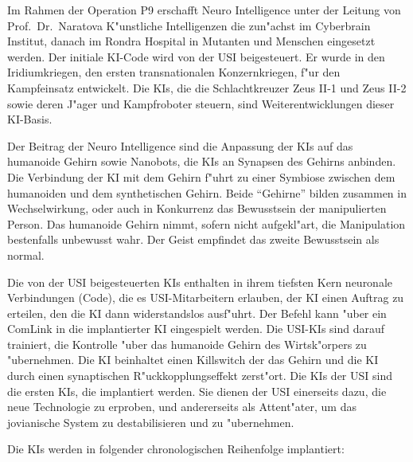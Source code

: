 
Im Rahmen der Operation P9 erschafft Neuro Intelligence unter der Leitung von Prof.~Dr.~Naratova K"unstliche Intelligenzen die zun"achst im Cyberbrain Institut, danach im Rondra Hospital in Mutanten und Menschen eingesetzt werden. Der initiale KI-Code wird von der USI beigesteuert. Er wurde in den Iridiumkriegen, den ersten transnationalen Konzernkriegen, f"ur den Kampfeinsatz entwickelt. Die KIs, die die Schlachtkreuzer Zeus II-1 und Zeus II-2 sowie deren J"ager und Kampfroboter steuern, sind Weiterentwicklungen dieser KI-Basis. 

Der Beitrag der Neuro Intelligence sind die Anpassung der KIs auf das humanoide Gehirn sowie Nanobots, die KIs an Synapsen des Gehirns anbinden. Die Verbindung der KI mit dem Gehirn f"uhrt zu einer Symbiose zwischen dem humanoiden und dem synthetischen Gehirn. Beide ``Gehirne'' bilden zusammen in Wechselwirkung, oder auch in Konkurrenz das Bewusstsein der manipulierten Person. Das humanoide Gehirn nimmt, sofern nicht aufgekl"art, die Manipulation bestenfalls unbewusst wahr. Der Geist empfindet das zweite Bewusstsein als normal.

Die von der USI beigesteuerten KIs enthalten in ihrem tiefsten Kern neuronale Verbindungen (Code), die es USI-Mitarbeitern erlauben, der KI einen Auftrag zu erteilen, den die KI dann widerstandslos ausf"uhrt. Der Befehl kann "uber ein ComLink in die implantierter KI eingespielt werden. Die USI-KIs sind darauf trainiert, die Kontrolle "uber das humanoide Gehirn des Wirtsk"orpers zu "ubernehmen. Die KI beinhaltet einen Killswitch der das Gehirn und die KI durch einen synaptischen R"uckkopplungseffekt zerst"ort. Die KIs der USI sind die ersten KIs, die implantiert werden. Sie dienen der USI einerseits dazu, die neue Technologie zu erproben, und andererseits als Attent"ater, um das jovianische System zu destabilisieren und zu "ubernehmen. 

Die KIs werden in folgender chronologischen Reihenfolge implantiert:

